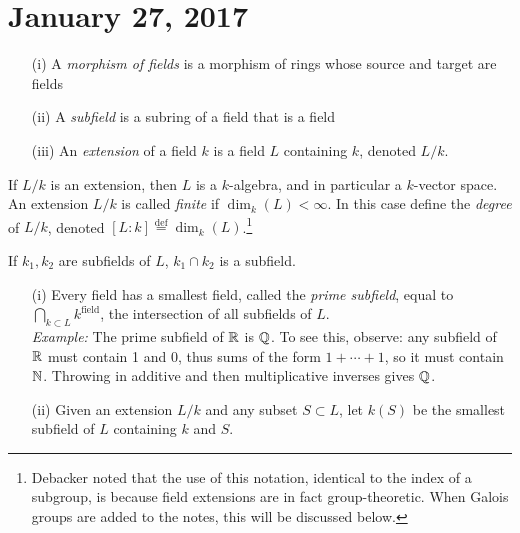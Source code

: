 \section{January 27, 2017}

\begin{defn}
\hspace{0.5cm}
\begin{enumerate}
\item[(i)] A \textit{morphism of fields} is a morphism of rings whose source and target are fields
\item[(ii)] A \textit{subfield} is a subring of a field that is a field
\item[(iii)] An \textit{extension} of a field $k$ is a field $L$ containing $k$, denoted $L/k$.
\end{enumerate}
\end{defn}

\begin{rmk}
If $L/k$ is an extension, then $L$ is a $k$-algebra, and in particular a $k$-vector space. An extension $L/k$ is called \textit{finite} if $\dim_k(L) < \infty$. In this case define the \textit{degree} of $L/k$, denoted $[L : k] \stackrel{\text{def}}{=} \dim_k(L)$.\footnote{Debacker noted that the use of this notation, identical to the index of a subgroup, is because field extensions are in fact group-theoretic. When Galois groups are added to the notes, this will be discussed below.}
 \end{rmk}

\begin{fact}
 If $k_1, k_2$ are subfields of $L$, $k_1 \cap k_2$ is a subfield.
\end{fact}

\begin{defn}
\hspace{0.5cm}
\begin{enumerate}
\item[(i)] Every field has a smallest field, called the \textit{prime subfield}, equal to $\bigcap_{k \subset L} k^{\text{field}}$, the intersection of all subfields of $L$. \\
\textit{Example:} The prime subfield of $\mathbb{R}$ is $\mathbb{Q}$. To see this, observe: any subfield of $\mathbb{R}$ must contain 1 and 0, thus sums of the form $1 + \cdots + 1$, so it must contain $\mathbb{N}$. Throwing in additive and then multiplicative inverses gives $\mathbb{Q}$.
\item[(ii)] Given an extension $L/k$ and any subset $S \subset L$, let $k(S)$ be the smallest subfield of $L$ containing $k$ and $S$.
\end{enumerate}
\end{defn}

